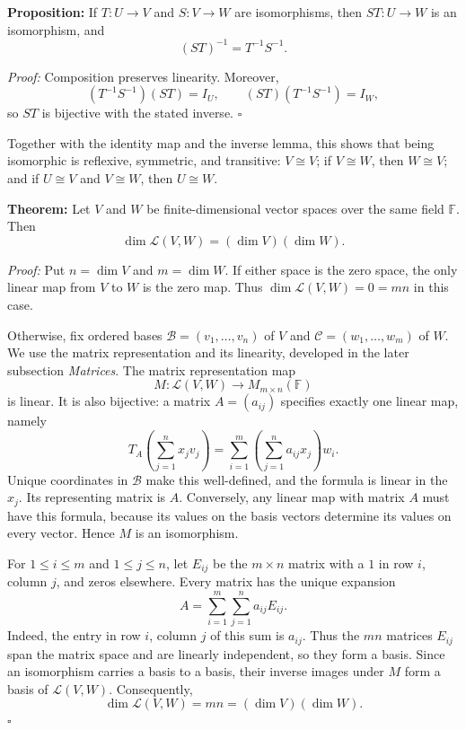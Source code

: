 \documentclass[a4paper,11pt,abstract=true]{scrartcl}
\theoremstyle{dotlessP}
\theoremstyle{dotlessS}
\theoremstyle{remark}
\theoremstyle{definition}
\begin{document}
\begin{problem_box}
\textbf{Proposition:} If
$T:U\longrightarrow V$ and $S:V\longrightarrow W$ are isomorphisms, then
$ST:U\longrightarrow W$ is an isomorphism, and
\[
{(ST)}^{-1}=T^{-1}S^{-1}.
\]

\end{problem_box}

\begin{claim_box}
\textit{Proof:} Composition preserves linearity. Moreover,
\[
(T^{-1}S^{-1})(ST)=I_U,
\qquad (ST)(T^{-1}S^{-1})=I_W,
\]
so $ST$ is bijective with the stated inverse. \hfill$\square$

Together with the identity map and the inverse lemma, this shows that
being isomorphic is reflexive, symmetric, and transitive: $V\cong V$;
if $V\cong W$, then $W\cong V$; and if $U\cong V$ and $V\cong W$,
then $U\cong W$.
\end{claim_box}

\begin{problem_box}
\textbf{Theorem:}
Let
$V$ and $W$ be finite-dimensional vector spaces over the same field
$\mathbb{F}$. Then
\[
\dim\mathcal{L}(V,W)=(\dim V)(\dim W).
\]
\end{problem_box}

\begin{claim_box}
\textit{Proof:} Put $n=\dim V$ and $m=\dim W$. If either space is
the zero space, the only linear map from $V$ to $W$ is the zero map.
Thus $\dim\mathcal{L}(V,W)=0=mn$ in this case.

Otherwise, fix ordered bases $\mathcal{B}=(v_1,\ldots,v_n)$ of $V$
and $\mathcal{C}=(w_1,\ldots,w_m)$ of $W$. We use the matrix
representation and its linearity, developed in the later subsection
\emph{Matrices}. The matrix representation map
\[
M:\mathcal{L}(V,W)\longrightarrow M_{m\times n}(\mathbb{F})
\]
is linear. It is also bijective: a matrix $A=(a_{ij})$ specifies
exactly one linear map, namely
\[
T_A\left(\sum_{j=1}^n x_j v_j\right)
=\sum_{i=1}^m\left(\sum_{j=1}^n a_{ij}x_j\right)w_i.
\]
Unique coordinates in $\mathcal{B}$ make this well-defined, and the
formula is linear in the $x_j$. Its representing matrix is $A$.
Conversely, any linear map with matrix $A$ must have this formula,
because its values on the basis vectors determine its values on every
vector. Hence $M$ is an isomorphism.

For $1\leq i\leq m$ and $1\leq j\leq n$, let $E_{ij}$ be the
$m\times n$ matrix with a $1$ in row $i$, column $j$, and zeros
elsewhere. Every matrix has the unique expansion
\[
A=\sum_{i=1}^m\sum_{j=1}^n a_{ij}E_{ij}.
\]
Indeed, the entry in row $i$, column $j$ of this sum is $a_{ij}$.
Thus the $mn$ matrices $E_{ij}$ span the matrix space and are linearly
independent, so they form a basis. Since an isomorphism carries a basis
to a basis, their inverse images under $M$ form a basis of
$\mathcal{L}(V,W)$. Consequently,
\[
\dim\mathcal{L}(V,W)=mn=(\dim V)(\dim W).
\]
\hfill$\square$
\end{claim_box}
\end{document}
